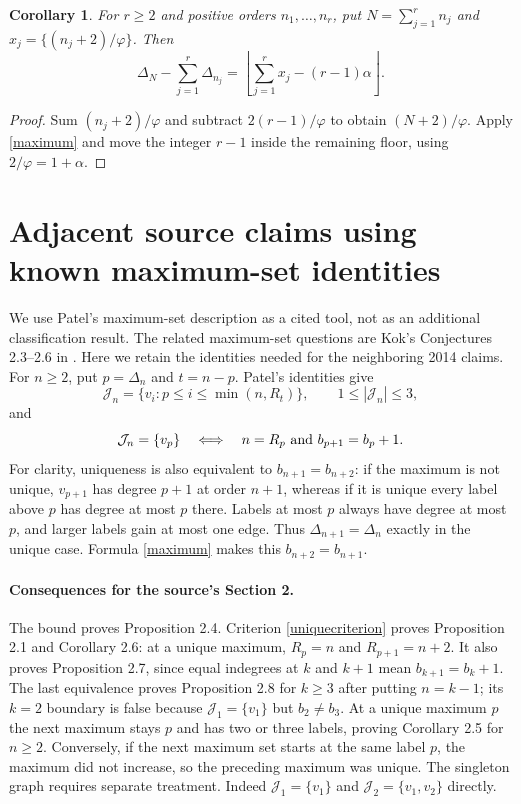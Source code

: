 \documentclass[11pt]{article}
\newtheorem{corollary}[theorem]{Corollary}
\newcommand{\fl}[1]{\left\lfloor #1\right\rfloor}
\newcommand{\J}{\mathcal J}
\newcommand{\ph}{\varphi}
\begin{document}
\begin{corollary}\label{many}
For $r\ge2$ and positive orders $n_1,\ldots,n_r$, put
$N=\sum_{j=1}^r n_j$ and $x_j=\{(n_j+2)/\ph\}$. Then
\[
 \Delta_N-\sum_{j=1}^r\Delta_{n_j}
   =\fl{\sum_{j=1}^r x_j-(r-1)\alpha}.
\]
\end{corollary}
\begin{proof}
Sum $(n_j+2)/\ph$ and subtract $2(r-1)/\ph$ to obtain
$(N+2)/\ph$. Apply \eqref{maximum} and move the integer $r-1$
inside the remaining floor, using $2/\ph=1+\alpha$.
\end{proof}

\section{Adjacent source claims using known maximum-set identities}
We use Patel's maximum-set description \cite{patelsets} as a cited tool,
not as an additional classification result. The related maximum-set
questions are Kok's Conjectures 2.3--2.6 in \cite[Section 2.2]{sequences}.
Here we retain the identities needed for the neighboring 2014 claims.
For $n\ge2$, put $p=\Delta_n$ and $t=n-p$. Patel's identities give
\begin{equation}\label{setinterval}
 \J_n=\{v_i:p\le i\le\min(n,R_t)\},\qquad 1\le|\J_n|\le3,
\end{equation}
and
\begin{equation}\label{uniquecriterion}
 \J_n=\{v_p\}\quad\Longleftrightarrow\quad
 n=R_p\ \hbox{and}\ b_{p+1}=b_p+1.
\end{equation}
For clarity, uniqueness is also equivalent to $b_{n+1}=b_{n+2}$:
if the maximum is not unique, $v_{p+1}$ has degree $p+1$ at order
$n+1$, whereas if it is unique every label above $p$ has degree at
most $p$ there. Labels at most $p$ always have degree at most $p$,
and larger labels gain at most one edge. Thus
$\Delta_{n+1}=\Delta_n$ exactly in the unique case. Formula
\eqref{maximum} makes this $b_{n+2}=b_{n+1}$.

\paragraph{Consequences for the source's Section 2.}
The bound proves Proposition 2.4. Criterion \eqref{uniquecriterion}
proves Proposition 2.1 and Corollary 2.6: at a unique maximum,
$R_p=n$ and $R_{p+1}=n+2$. It also proves Proposition 2.7, since
equal indegrees at $k$ and $k+1$ mean $b_{k+1}=b_k+1$.
The last equivalence proves Proposition 2.8 for $k\ge3$ after
putting $n=k-1$; its $k=2$ boundary is false because $\J_1=\{v_1\}$
but $b_2\ne b_3$. At a unique maximum $p$ the next maximum stays
$p$ and has two or three labels, proving Corollary 2.5 for $n\ge2$.
Conversely, if the next maximum set starts at the same label $p$,
the maximum did not increase, so the preceding maximum was unique.
The singleton graph requires separate treatment.
Indeed $\J_1=\{v_1\}$ and $\J_2=\{v_1,v_2\}$ directly.
\end{document}
